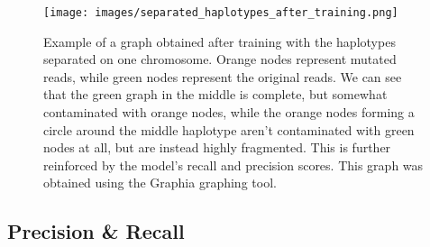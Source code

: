 \documentclass[times, utf8, diplomski, english]{fer_eng}
\begin{document}
\begin{figure}
	\centering
	\texttt{[image: images/separated\_haplotypes\_after\_training.png]}
	\caption[Separated graph after training]{Example of a graph obtained after training with the haplotypes separated on one chromosome. Orange nodes represent mutated reads, while green nodes represent the original reads. We can see that the green graph in the middle is complete, but somewhat contaminated with orange nodes, while the orange nodes forming a circle around the middle haplotype aren't contaminated with green nodes at all, but are instead highly fragmented. This is further reinforced by the model's recall and precision scores. This graph was obtained using the Graphia\footnotemark{} graphing tool.}
	\label{fig:separated graph after training}
\end{figure}

\subsection{Precision \& Recall}
\label{subsec:precision and recall}
\end{document}
